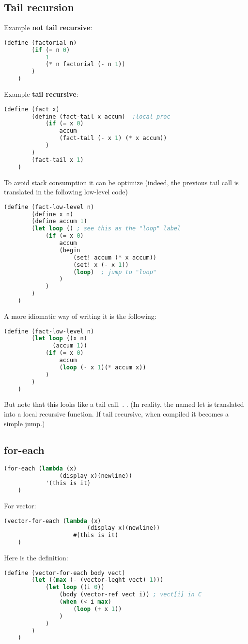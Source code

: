 \subsection{Tail recursion}
Example \textbf{not tail recursive}:
\begin{lstlisting}[language=Lisp]
    (define (factorial n)
        (if (= n 0)
            1
            (* n factorial (- n 1))
        )
    )
\end{lstlisting}
Example \textbf{tail recursive}:
\begin{lstlisting}[language=Lisp]
    (define (fact x)
        (define (fact-tail x accum)  ;local proc
            (if (= x 0)
                accum
                (fact-tail (- x 1) (* x accum))
            )
        )
        (fact-tail x 1)
    )
\end{lstlisting}
To avoid stack consumption it can be optimize (indeed, the previous tail call is translated in the following low-level code)
\begin{lstlisting}[language=Lisp]
    (define (fact-low-level n)
        (define x n)
        (define accum 1)
        (let loop () ; see this as the "loop" label
            (if (= x 0)
                accum
                (begin
                    (set! accum (* x accum))
                    (set! x (- x 1))
                    (loop)  ; jump to "loop"
                )
            )
        )  
    )
\end{lstlisting}
A more idiomatic way of writing it is the following:
\begin{lstlisting}[language=Lisp]
    (define (fact-low-level n)
        (let loop ((x n)
              (accum 1))
            (if (= x 0)
                accum
                (loop (- x 1)(* accum x))
            )
        )  
    )
\end{lstlisting}
But note that this looks like a tail call. . .
(In reality, the named let is translated into a local recursive function. If tail
recursive, when compiled it becomes a simple jump.)

\subsection{for-each}
\begin{lstlisting}[language=Lisp]
    (for-each (lambda (x)
                (display x)(newline))
            '(this is it)
    )
\end{lstlisting}
For vector:
\begin{lstlisting}[language=Lisp]
    (vector-for-each (lambda (x)
                        (display x)(newline))
                    #(this is it)
    )
\end{lstlisting}
Here is the definition:
\begin{lstlisting}[language=Lisp]
    (define (vector-for-each body vect)
        (let ((max (- (vector-leght vect) 1)))
            (let loop ((i 0))
                (body (vector-ref vect i)) ; vect[i] in C
                (when (< i max)
                    (loop (+ x 1))
                )
            )
        )
    )
\end{lstlisting}

